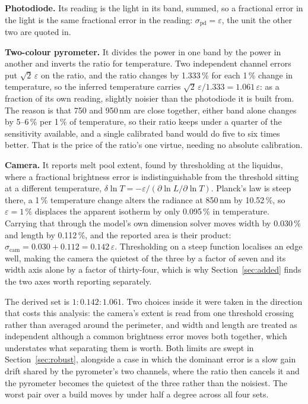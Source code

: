 \documentclass[final,5p,times,twocolumn]{elsarticle}
\begin{document}
\textbf{Photodiode.} Its reading is the light in its band, summed, so a
fractional error in the light is the same fractional error in the reading:
$\sigma_{\mathrm{pd}} = \varepsilon$, the unit the other two are quoted in.

\textbf{Two-colour pyrometer.} It divides the power in one band by the power in
another and inverts the ratio for temperature. Two independent channel errors
put $\sqrt{2}\,\varepsilon$ on the ratio, and the ratio changes by 1.333\,\% for
each 1\,\% change in temperature, so the inferred temperature carries
$\sqrt{2}\,\varepsilon/1.333 = 1.061\,\varepsilon$: as a fraction of its own
reading, slightly noisier than the photodiode it is built from. The reason is
that 750 and 950\,nm are close together, either band alone changes by
5--6\,\% per 1\,\% of temperature, so their ratio keeps under a quarter of the
sensitivity available, and a single calibrated band would do five to six times
better. That is the price of the ratio's one virtue, needing no absolute
calibration.

\textbf{Camera.} It reports melt pool extent, found by thresholding at the
liquidus, where a fractional brightness error is indistinguishable from the
threshold sitting at a different temperature, $\delta \ln T = -\varepsilon /
(\partial \ln L/\partial \ln T)$. Planck's law is steep there, a 1\,\%
temperature change alters the radiance at 850\,nm by 10.52\,\%, so
$\varepsilon = 1\,\%$ displaces the apparent isotherm by only 0.095\,\% in
temperature. Carrying that through the model's own dimension solver moves width
by 0.030\,\% and length by 0.112\,\%, and the reported area is their product:
$\sigma_{\mathrm{cam}} = 0.030 + 0.112 = 0.142\,\varepsilon$. Thresholding on a
steep function localises an edge well, making the camera the quietest of the
three by a factor of seven and its width axis alone by a factor of thirty-four,
which is why Section~\ref{sec:added} finds the two axes worth reporting
separately.

The derived set is $1 : 0.142 : 1.061$. Two choices inside it were taken in the
direction that costs this analysis: the camera's extent is read from one
threshold crossing rather than averaged around the perimeter, and width and
length are treated as independent although a common brightness error moves both
together, which understates what separating them is worth. Both limits are swept
in Section~\ref{sec:robust}, alongside a case in which the dominant error is a
slow gain drift shared by the pyrometer's two channels, where the ratio then
cancels it and the pyrometer becomes the quietest of the three rather than the
noisiest. The worst pair over a build moves by under half a degree across all
four sets.
\end{document}
